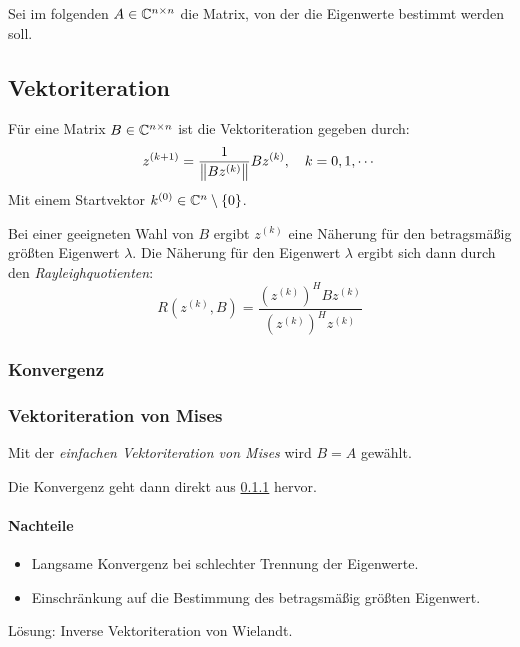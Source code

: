 		Sei im folgenden \( A \in \mathbb{C}^{ n \times n } \) die Matrix, von der die Eigenwerte bestimmt werden soll.

		\subsection{Vektoriteration}
			Für eine Matrix \( B \in \mathbb{C}^{n \times n} \) ist die Vektoriteration gegeben durch:
			\begin{equation*}
				z^{(k + 1)} = \frac{1}{\norm{Bz^{(k)}}} Bz^{(k)}, \quad k = 0, 1, \cdots
			\end{equation*}
			Mit einem Startvektor \( k^{(0)} \in \mathbb{C}^n \setminus \{0\} \).

			Bei einer geeigneten Wahl von \(B\) ergibt \(z^{(k)}\) eine Näherung für den betragsmäßig größten Eigenwert \(\lambda\). Die Näherung für den Eigenwert \(\lambda\) ergibt sich dann durch den \textit{Rayleighquotienten}:
			\begin{equation*}
				R(z^{(k)}, B) = \frac{(z^{(k)})^H B z^{(k)}}{(z^{(k)})^H z^{(k)}}
			\end{equation*}

			\subsubsection{Konvergenz}
				\label{sec:eqconvergence}


			\subsubsection{Vektoriteration von Mises}
				Mit der \textit{einfachen Vektoriteration von Mises} wird \( B = A \) gewählt.

				Die Konvergenz geht dann direkt aus \ref{sec:eqconvergence} hervor.

				\paragraph{Nachteile}
					\begin{itemize}
						\item Langsame Konvergenz bei schlechter Trennung der Eigenwerte.
						\item Einschränkung auf die Bestimmung des betragsmäßig größten Eigenwert.
					\end{itemize}
					Lösung: Inverse Vektoriteration von Wielandt.

